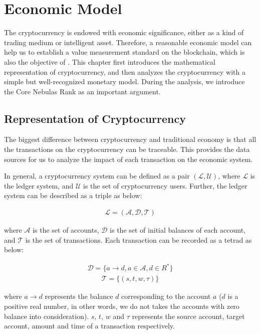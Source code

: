 \section{Economic Model}
The cryptocurrency is endowed with economic significance, either as a kind of trading medium or intelligent asset. Therefore, a reasonable economic model can help us to establish a value measurement standard on the blockchain, which is also the objective of \nrcore. This chapter first introduces the mathematical representation of cryptocurrency, and then analyzes the cryptocurrency with a simple but well-recognized monetary model. During the analysis, we introduce the Core Nebulas Rank as an important argument.

\subsection{Representation of Cryptocurrency}
The biggest difference between cryptocurrency and traditional economy is that all the transactions on the cryptocurrency can be traceable. This provides the data sources for us to analyze the impact of each transaction on the economic system.

In general, a cryptocurrency system can be defined as a pair $(\mathcal{L}, \mathcal{U})$, where $\mathcal{L}$ is the ledger system, and $\mathcal{U}$ is the set of cryptocurrency users. Further, the ledger system can be described as a triple as below:

\begin{align}
\mathcal{L} = (\mathcal{A}, \mathcal{D}, \mathcal{T})
\end{align}

\noindent where $\mathcal{A}$ is the set of accounts, $\mathcal{D}$ is the set of initial balances of each account, and $\mathcal{T}$ is the set of transactions. Each transaction can be recorded as a tetrad as below:

\begin{align}
\mathcal{D} = \{a \rightarrow d, a{\in}\mathcal{A}, d{\in}R^*\}
\end{align}
\begin{align}
\mathcal{T} = \{(s, t, w, \tau)\}
\end{align}

\noindent where $a \rightarrow d$ represents the balance $d$ corresponding to the account $a$ ($d$ is a positive real number, in other words, we do not takes the accounts with zero balance into consideration). $s$, $t$, $w$ and $\tau$ represents the source account, target account, amount and time of a transaction respectively.

